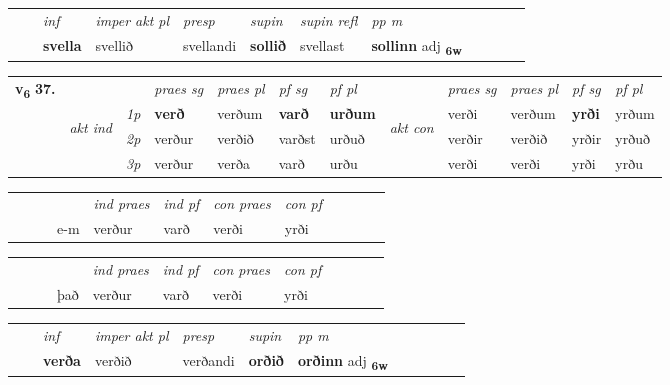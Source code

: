 \begin{tabular}{llllllllllll}
 & & \textit{inf}  & \textit{imper akt pl}   & \textit{presp} & \textit{supin} & \textit{supin refl} & \textit{pp m}     \\*
  & & \textbf{svella}   & svellið   & svellandi &  \textbf{sollið} & svellast & \textbf{sollinn} adj \textbf{\textsubscript{6w}} \\*
\cmidrule{1-12}
\end{tabular}



\begin{tabular}{llllllllllll} \toprule
\multirow{4}{*}{{{\textbf{v{\textsubscript{6}}} \Large{\textbf{37.}}}}}  & &   &  \textit{praes sg}  & \textit{praes pl}  &\textit{ pf sg} & \textit{pf pl} &  &  \textit{praes sg}  & \textit{praes pl}  & \textit{pf sg} & \textit{pf pl } \\*
	\cmidrule{4-7} \cmidrule{9-12}
 & \multirow{3}{*}{\begin{turn}{90}\textit{akt ind}\end{turn}} & {\textit{1p}} & \textbf{verð} & verðum    & \textbf{varð} & \textbf{urðum} & \multirow{3}{*}{\begin{turn}{90}\textit{akt con}\end{turn}} &verði & verðum & \textbf{yrði} & yrðum\\*
& &  {\textit{2p}} &  verður  & verðið   & varðst & urðuð & & verðir & verðið & yrðir & yrðuð \\*
& &  {\textit{3p}} & verður & verða   & varð & urðu & & verði & verði& yrði & yrðu  \\*
\cmidrule{4-7} \cmidrule{9-12}
\end{tabular}


\begin{tabular}{llllllllllll}
 & &  & &  \textit{ind praes} & \textit{ind pf} & \textit{con praes} & \textit{con pf} \\*
&  & & e-m & verður & varð & verði & yrði \\*
\cmidrule{5-9}
\end{tabular}


\begin{tabular}{llllllllllll}
 & &  & &  \textit{ind praes} & \textit{ind pf} & \textit{con praes} & \textit{con pf} \\*
&  & & það & verður & varð & verði & yrði \\*
\cmidrule{5-9}
\end{tabular}


\begin{tabular}{llllllllllll}
 & & \textit{inf}  & \textit{imper akt pl}   & \textit{presp} & \textit{supin}  & \textit{pp m}     \\*
  & & \textbf{verða}   & verðið   & verðandi &  \textbf{orðið}  & \textbf{orðinn} adj \textbf{\textsubscript{6w}} \\*
\cmidrule{1-12}
\end{tabular}



